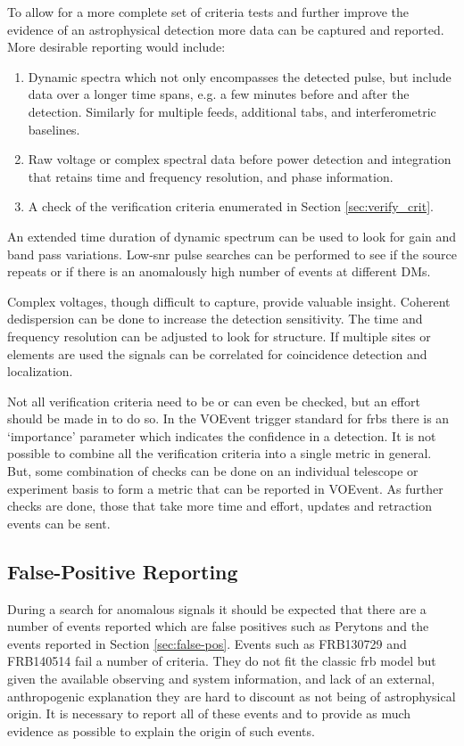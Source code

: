 \documentclass[a4paper,fleqn,usenatbib]{mnras}
\begin{document}
To allow for a more complete set of criteria tests and further improve the
evidence of an astrophysical detection more data can be captured and reported.
More desirable reporting would include:

\begin{enumerate}
    \item Dynamic spectra which not only encompasses the detected pulse, but
    include data over a longer time spans, e.g. a few minutes before and after
    the detection. Similarly for multiple feeds, additional \glspl{tab}, and
    interferometric baselines.
    \item Raw voltage or complex spectral data before power detection and
    integration that retains time and frequency resolution, and phase
    information.
    \item A check of the verification criteria enumerated in Section
    \ref{sec:verify_crit}.
\end{enumerate}

An extended time duration of dynamic spectrum can be used to look for gain and
band pass variations. Low-\gls{snr} pulse searches can be performed to see if
the source repeats or if there is an anomalously high number of events at
different DMs.

Complex voltages, though difficult to capture, provide valuable insight.
Coherent dedispersion can be done to increase the detection sensitivity. The
time and frequency resolution can be adjusted to look for structure. If multiple
sites or elements are used the signals can be correlated for coincidence
detection and localization.

Not all verification criteria need to be or can even be checked, but an effort
should be made in to do so. In the VOEvent trigger standard for \glspl{frb}
\citep{2017arXiv171008155P} there is an `importance' parameter which indicates
the confidence in a detection. It is not possible to combine all the
verification criteria into a single metric in general. But, some combination of
checks can be done on an individual telescope or experiment basis to form a
metric that can be reported in VOEvent. As further checks are done, those that
take more time and effort, updates and retraction events can be sent.

\subsection{False-Positive Reporting}

During a search for anomalous signals it should be expected that there are a
number of events reported which are false positives such as Perytons
\citep{2011ApJ...727...18B} and the events reported in Section
\ref{sec:false-pos}.  Events such as FRB130729 and FRB140514 fail a number of
criteria. They do not fit the classic \gls{frb} model but given the available
observing and system information, and lack of an external, anthropogenic
explanation they are hard to discount as not being of astrophysical origin. It
is necessary to report all of these events and to provide as much evidence as
possible to explain the origin of such events.
\end{document}
